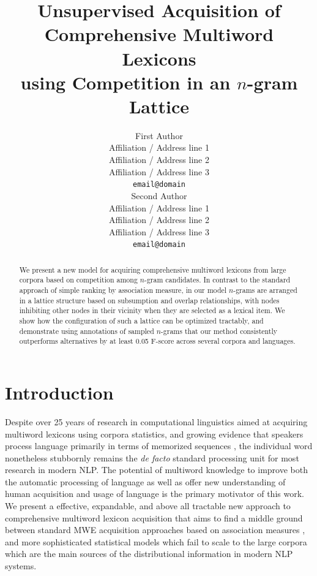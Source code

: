 \documentclass[11pt,letterpaper]{article}
\title{Unsupervised Acquisition of Comprehensive Multiword Lexicons \\ using Competition in an $n$-gram Lattice}
\author{First Author \\
  Affiliation / Address line 1 \\
  Affiliation / Address line 2 \\
  Affiliation / Address line 3 \\
  {\tt email@domain} \\\And
  Second Author \\
  Affiliation / Address line 1 \\
  Affiliation / Address line 2 \\
  Affiliation / Address line 3 \\
  {\tt email@domain} \\}
\date{}
\begin{document}
\maketitle


\begin{abstract}
We present a new model for acquiring comprehensive multiword lexicons from large corpora based on  competition among $n$-gram candidates. In contrast to the standard approach of simple ranking by association measure, in our model $n$-grams are arranged in a lattice structure based on subsumption and overlap relationships, with nodes inhibiting other nodes in their vicinity when they are selected as a lexical item. We show how the configuration of such a lattice can be optimized tractably, and demonstrate using annotations of sampled $n$-grams that our method consistently outperforms alternatives by at least 0.05 F-score across several corpora and languages.
\end{abstract}


\section{Introduction}

Despite over 25 years of research in computational linguistics aimed at acquiring multiword lexicons using corpora statistics, and growing evidence that speakers process language primarily in terms of memorized sequences \cite{Wray08}, the individual word nonetheless stubbornly remains the \textit{de facto} standard processing unit for most research in modern NLP. The potential of multiword knowledge to improve both the automatic processing of language as well as offer new understanding of human acquisition and usage of language is the primary motivator of this work. We present a effective, expandable, and above all tractable new approach to comprehensive multiword lexicon acquisition that aims to find a middle ground between standard MWE acquisition approaches based on association measures \cite{Ramisch14}, and more sophisticated statistical models \cite{Newman12} which fail to scale to the large corpora which are the main sources of the distributional information in modern NLP systems.
\end{document}

